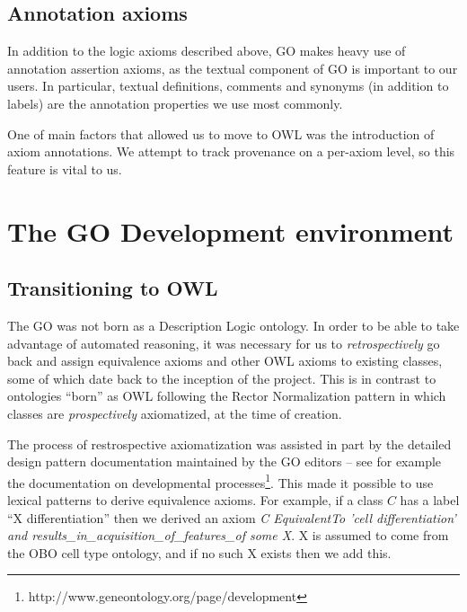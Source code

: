 \documentclass{llncs}
\begin{document}
\subsection{Annotation axioms}

In addition to the logic axioms described above, GO makes heavy use of
annotation assertion axioms, as the textual component of GO is
important to our users. In particular, textual definitions, comments
and synonyms (in addition to labels) are the annotation properties we
use most commonly.

One of main factors that allowed us to move to OWL was the
introduction of axiom annotations. We attempt to track provenance on a
per-axiom level, so this feature is vital to us.


\section{The GO Development environment}

\subsection{Transitioning to OWL}


The GO was not born as a Description Logic ontology. In order to be
able to take advantage of automated reasoning, it was necessary for us
to \emph{retrospectively} go back and assign equivalence axioms and
other OWL axioms to existing classes, some of which date back to the
inception of the project. This is in contrast to ontologies ``born''
as OWL following the Rector Normalization
pattern\cite{rector_modularisation_2003} in which classes are
\emph{prospectively} axiomatized, at the time of creation.

The process of restrospective axiomatization was assisted in part by
the detailed design pattern documentation maintained by the GO editors
-- see for example the documentation on developmental
processes\footnote{http://www.geneontology.org/page/development}. This
made it possible to use lexical patterns to derive equivalence
axioms\cite{Mungall2010GOXP}. For example, if a class $C$ has a label
``X differentiation'' then we derived an axiom \emph{C EquivalentTo
  'cell differentiation' and
  results\_in\_acquisition\_of\_features\_of some X}. X is assumed to
come from the OBO cell type ontology, and if no such X exists then we
add this.
\end{document}
